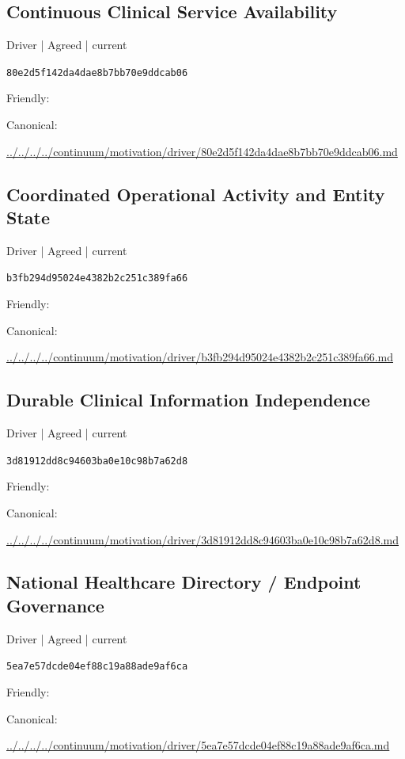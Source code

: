 \documentclass[10pt,a4paper]{article}
\begin{document}
\subsection*{Continuous Clinical Service Availability}
{\small Driver | Agreed | current}\par
\texttt{80e2d5f142da4dae8b7bb70e9ddcab06}\par
Friendly: \par
Canonical: \par
{\footnotesize\url{../../../../continuum/motivation/driver/80e2d5f142da4dae8b7bb70e9ddcab06.md}}\par
\subsection*{Coordinated Operational Activity and Entity State}
{\small Driver | Agreed | current}\par
\texttt{b3fb294d95024e4382b2c251c389fa66}\par
Friendly: \par
Canonical: \par
{\footnotesize\url{../../../../continuum/motivation/driver/b3fb294d95024e4382b2c251c389fa66.md}}\par
\subsection*{Durable Clinical Information Independence}
{\small Driver | Agreed | current}\par
\texttt{3d81912dd8c94603ba0e10c98b7a62d8}\par
Friendly: \par
Canonical: \par
{\footnotesize\url{../../../../continuum/motivation/driver/3d81912dd8c94603ba0e10c98b7a62d8.md}}\par
\subsection*{National Healthcare Directory / Endpoint Governance}
{\small Driver | Agreed | current}\par
\texttt{5ea7e57dcde04ef88c19a88ade9af6ca}\par
Friendly: \par
Canonical: \par
{\footnotesize\url{../../../../continuum/motivation/driver/5ea7e57dcde04ef88c19a88ade9af6ca.md}}\par
\end{document}
